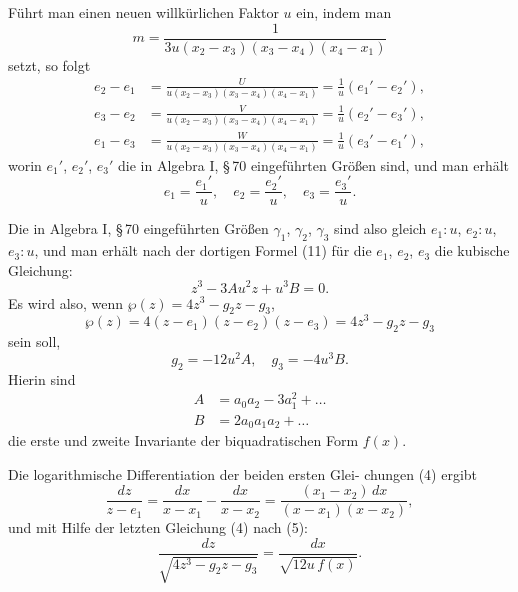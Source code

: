 \documentclass[12pt,a4paper]{book}
\theoremstyle{definition}
\begin{document}
F\"uhrt man einen neuen willk\"urlichen Faktor $u$ ein, indem
man
\begin{equation}
m = \frac{1}{3u(x_2 - x_3)(x_3 - x_4)(x_4 - x_1)} \tag{5}
\end{equation}
setzt, so folgt
\[
\begin{aligned}
e_2 - e_1 &= \frac{U}{u(x_2 - x_3)(x_3 - x_4)(x_4 - x_1)} = \frac{1}{u}(e_1' - e_2'),\\
e_3 - e_2 &= \frac{V}{u(x_2 - x_3)(x_3 - x_4)(x_4 - x_1)} = \frac{1}{u}(e_2' - e_3'),\\
e_1 - e_3 &= \frac{W}{u(x_2 - x_3)(x_3 - x_4)(x_4 - x_1)} = \frac{1}{u}(e_3' - e_1'),
\end{aligned}
\]
worin $e_1'$, $e_2'$, $e_3'$ die in Algebra I, \S\,70 eingef\"uhrten Gr\"o\ss en
sind, und man erh\"alt
\[
e_1 = \frac{e_1'}{u}, \quad e_2 = \frac{e_2'}{u}, \quad e_3 = \frac{e_3'}{u}.
\]

Die in Algebra I, \S\,70 eingef\"uhrten Gr\"o\ss en $\gamma_1$, $\gamma_2$, $\gamma_3$ sind
also gleich $e_1:u$, $e_2:u$, $e_3:u$, und man erh\"alt nach der dortigen
Formel (11) f\"ur die $e_1$, $e_2$, $e_3$ die kubische Gleichung:
\[
z^3 - 3Au^2 z + u^3 B = 0.
\]
Es wird also, wenn $\wp(z) = 4z^3 - g_2 z - g_3$,
\[
\wp(z) = 4(z - e_1)(z - e_2)(z - e_3) = 4z^3 - g_2 z - g_3
\]
sein soll,
\begin{equation}
g_2 = -12u^2 A, \quad g_3 = -4u^3 B. \tag{6}
\end{equation}
Hierin sind
\begin{equation}
\begin{aligned}
A &= a_0 a_2 - 3a_1^2 + \dots \\
B &= 2a_0 a_1 a_2 + \dots
\end{aligned}
\tag{7}
\end{equation}
die erste und zweite Invariante der biquadratischen Form $f(x)$.

Die logarithmische Differentiation der beiden ersten Glei-
chungen (4) ergibt
\[
\frac{dz}{z - e_1} = \frac{dx}{x - x_1} - \frac{dx}{x - x_2} = \frac{(x_1 - x_2)\,dx}{(x - x_1)(x - x_2)},
\]
und mit Hilfe der letzten Gleichung (4) nach (5):
\begin{equation}
\frac{dz}{\sqrt{4z^3 - g_2 z - g_3}} = \frac{dx}{\sqrt{12u\,f(x)}}. \tag{8}
\end{equation}
\end{document}
